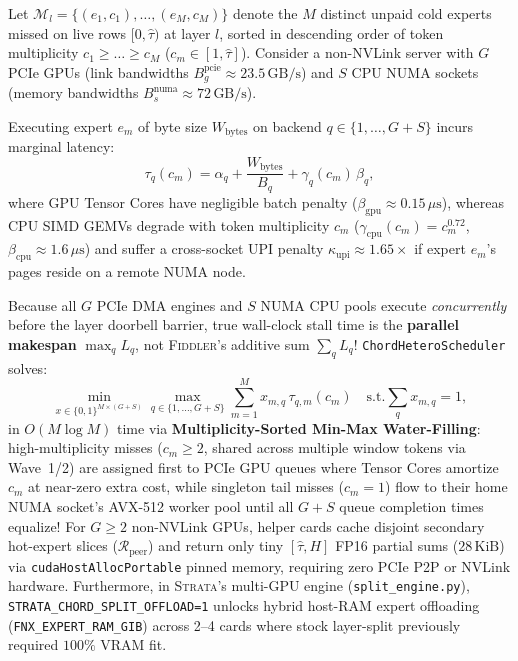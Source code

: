 \documentclass[10pt,twocolumn]{article}
\theoremstyle{definition}
\begin{document}
Let $\mathcal{M}_l = \{(e_1, c_1), \dots, (e_M, c_M)\}$ denote the $M$ distinct unpaid cold experts missed on live rows $[0, \hat{\tau})$ at layer $l$, sorted in descending order of token multiplicity $c_1 \ge \dots \ge c_M$ ($c_m \in [1, \hat{\tau}]$). Consider a non-NVLink server with $G$ PCIe GPUs (link bandwidths $B^{\text{pcie}}_g \approx 23.5\,\text{GB/s}$) and $S$ CPU NUMA sockets (memory bandwidths $B^{\text{numa}}_s \approx 72\,\text{GB/s}$).

Executing expert $e_m$ of byte size $W_{\text{bytes}}$ on backend $q \in \{1,\dots,G+S\}$ incurs marginal latency:
\begin{equation}
  \tau_q(c_m) = \alpha_q + \frac{W_{\text{bytes}}}{B_q} + \gamma_q(c_m)\,\beta_q,
  \label{eq:cost_model}
\end{equation}
where GPU Tensor Cores have negligible batch penalty ($\beta_{\text{gpu}} \approx 0.15\,\mu\text{s}$), whereas CPU SIMD GEMVs degrade with token multiplicity $c_m$ ($\gamma_{\text{cpu}}(c_m) = c_m^{0.72}$, $\beta_{\text{cpu}} \approx 1.6\,\mu\text{s}$) and suffer a cross-socket UPI penalty $\kappa_{\text{upi}} \approx 1.65\times$ if expert $e_m$'s pages reside on a remote NUMA node.

Because all $G$ PCIe DMA engines and $S$ NUMA CPU pools execute \emph{concurrently} before the layer doorbell barrier, true wall-clock stall time is the \textbf{parallel makespan} $\max_q L_q$, not \textsc{Fiddler}'s additive sum $\sum_q L_q$! \texttt{ChordHeteroScheduler} solves:
\begin{equation}
  \min_{x \in \{0,1\}^{M \times (G+S)}} \max_{q \in \{1,\dots,G+S\}} \sum_{m=1}^{M} x_{m,q}\,\tau_{q,m}(c_m) \quad \text{s.t.} \sum_{q} x_{m,q} = 1,
  \label{eq:minmax}
\end{equation}
in $O(M \log M)$ time via \textbf{Multiplicity-Sorted Min-Max Water-Filling}: high-multiplicity misses ($c_m \ge 2$, shared across multiple window tokens via Wave~1/2) are assigned first to PCIe GPU queues where Tensor Cores amortize $c_m$ at near-zero extra cost, while singleton tail misses ($c_m = 1$) flow to their home NUMA socket's AVX-512 worker pool until all $G + S$ queue completion times equalize! For $G \ge 2$ non-NVLink GPUs, helper cards cache disjoint secondary hot-expert slices ($\mathcal{R}_{\text{peer}}$) and return only tiny $[ \hat{\tau}, H ]$ FP16 partial sums ($28\,\text{KiB}$) via \texttt{cudaHostAllocPortable} pinned memory, requiring zero PCIe P2P or NVLink hardware. Furthermore, in \textsc{Strata}'s multi-GPU engine (\texttt{split\_engine.py}), \texttt{STRATA\_CHORD\_SPLIT\_OFFLOAD=1} unlocks hybrid host-RAM expert offloading (\texttt{FNX\_EXPERT\_RAM\_GIB}) across 2--4 cards where stock layer-split previously required $100\%$ VRAM fit.
\end{document}
